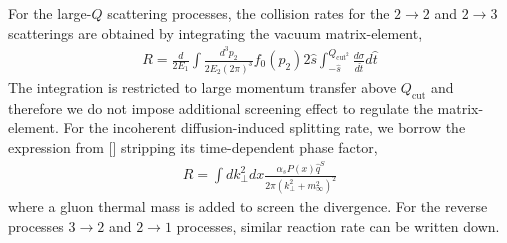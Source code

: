 \documentclass[aps, prc, reprint, amsmath, groupedaddress, nofootinbib]{revtex4-1}
\begin{document}
For the large-$Q$ scattering processes, the collision rates for the $2\rightarrow 2$ and $2\rightarrow 3$ scatterings are obtained by integrating the vacuum matrix-element,
\begin{eqnarray}
R = \frac{d}{2E_1}\int  \frac{d^3p_2}{2E_2(2\pi)^3} f_0(p_2)2\hat{s} \int_{-\hat{s}}^{Q_{\textrm{cut}^2}}\frac{d\sigma}{d\hat{t}}d\hat{t}
\end{eqnarray}
The integration is restricted to large momentum transfer above $Q_{\textrm{cut}}$ and therefore we do not impose additional screening effect to regulate the matrix-element.
For the incoherent diffusion-induced splitting rate, we borrow the expression from [] stripping its time-dependent phase factor,
\begin{eqnarray}
R = \int d k_\perp^2 dx \frac{\alpha_s P(x) \hat{q}^S}{2\pi (k_\perp^2 + m_\infty^2)^2}
\end{eqnarray}
where a gluon thermal mass is added to screen the divergence.
For the reverse processes $3\rightarrow 2$  and $2\rightarrow 1$ processes, similar reaction rate can be written down.
\end{document}
